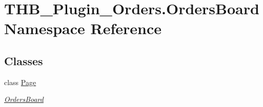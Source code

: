 \hypertarget{namespace_t_h_b___plugin___orders_1_1_orders_board}{}\section{T\+H\+B\+\_\+\+Plugin\+\_\+\+Orders.\+Orders\+Board Namespace Reference}
\label{namespace_t_h_b___plugin___orders_1_1_orders_board}
\subsection*{Classes}
\begin{DoxyCompactItemize}
\item 
class \mbox{\hyperlink{class_t_h_b___plugin___orders_1_1_orders_board_1_1_page}{Page}}
\begin{DoxyCompactList}\small\item\em \mbox{\hyperlink{class_t_h_b___plugin___orders_1_1_orders_board}{Orders\+Board}} \end{DoxyCompactList}\end{DoxyCompactItemize}
